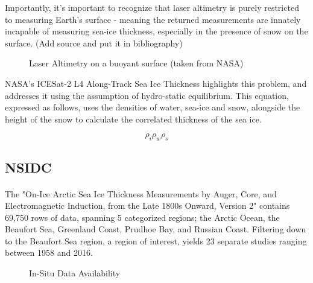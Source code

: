Importantly, it's important to recognize that laser altimetry is purely restricted to measuring Earth's surface - meaning the returned measurements are innately incapable of measuring sea-ice thickness, especially in the presence of snow on the surface. (Add source and put it in bibliography)
\begin{figure}[htb]
	\centering
	\caption{Laser Altimetry on a buoyant surface (taken from NASA) }
	\label{fig:hydro-static-diagram}
\end{figure}

NASA's ICESat-2 L4 Along-Track Sea Ice Thickness highlights this problem, and addresses it using the assumption of hydro-static equilibrium. This equation, expressed as follows, uses the densities of water, sea-ice and snow, alongside the height of the snow to calculate the correlated thickness of the sea ice.

\begin{equation*}
	\rho_i
	\rho_w
	\rho_s
\end{equation*}


\subsection*{NSIDC}
\paragraph*{}
The "On-Ice Arctic Sea Ice Thickness Measurements by Auger, Core, and Electromagnetic Induction, from the Late 1800s Onward, Version 2" contains 69,750 rows of data, spanning 5 categorized regions; the Arctic Ocean, the Beaufort Sea, Greenland Coast, Prudhoe Bay, and Russian Coast. Filtering down to the Beaufort Sea region, a region of interest, yields 23 separate studies ranging between 1958 and 2016.
\par
\begin{figure}[htb]
	\centering
	\caption{In-Situ Data Availability}
	\label{fig:foobar}
\end{figure}


